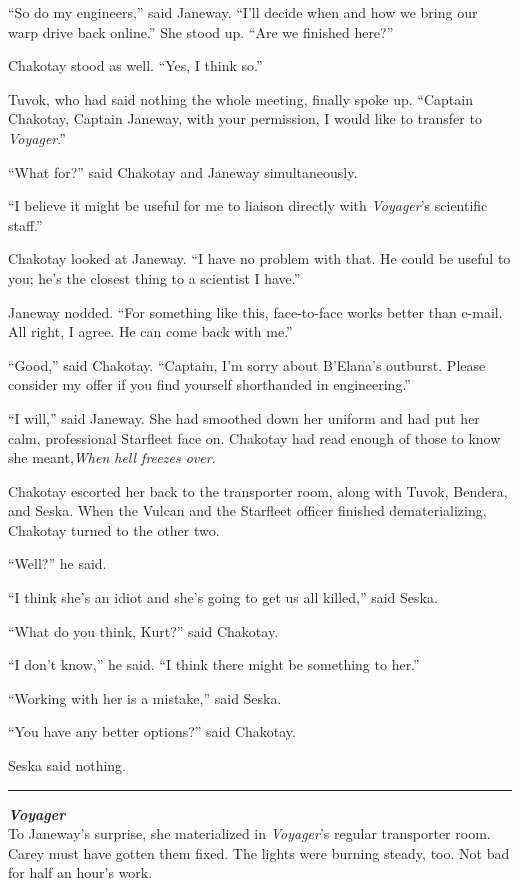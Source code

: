 \documentclass[twoside,letterpaper,12pt]{memoir}
\begin{document}
``So do my engineers,'' said Janeway. ``I'll decide when and how we bring our warp drive back online.'' She stood up. ``Are we finished here?''

Chakotay stood as well. ``Yes, I think so.''

Tuvok, who had said nothing the whole meeting, finally spoke up. ``Captain Chakotay, Captain Janeway, with your permission, I would like to transfer to \textit{Voyager}.''

``What for?'' said Chakotay and Janeway simultaneously.

``I believe it might be useful for me to liaison directly with \textit{Voyager}'s scientific staff.''

Chakotay looked at Janeway. ``I have no problem with that. He could be useful to you; he's the closest thing to a scientist I have.''

Janeway nodded. ``For something like this, face-to-face works better than e-mail. All right, I agree. He can come back with me.''

``Good,'' said Chakotay. ``Captain, I'm sorry about B'Elana's outburst. Please consider my offer if you find yourself shorthanded in engineering.''

``I will,'' said Janeway. She had smoothed down her uniform and had put her calm, professional Starfleet face on. Chakotay had read enough of those to know she meant,\textit{When hell freezes over}.

Chakotay escorted her back to the transporter room, along with Tuvok, Bendera, and Seska. When the Vulcan and the Starfleet officer finished dematerializing, Chakotay turned to the other two.

``Well?'' he said.

``I think she's an idiot and she's going to get us all killed,'' said Seska.

``What do you think, Kurt?'' said Chakotay.

``I don’t know,'' he said. ``I think there might be something to her.''

``Working with her is a mistake,'' said Seska.

``You have any better options?'' said Chakotay.

Seska said nothing.

\fancybreak{\rule{3cm}{0.4 pt}}
\noindent\textbf{\textit{Voyager}}\\

To Janeway's surprise, she materialized in \textit{Voyager}'s regular transporter room. Carey must have gotten them fixed. The lights were burning steady, too. Not bad for half an hour's work.
\end{document}

